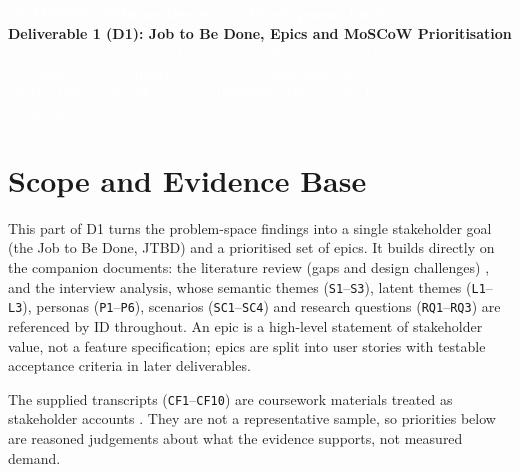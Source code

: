 \documentclass[12pt, a4paper]{article}
\begin{document}
\begin{tcolorbox}[enhanced, colback=cNavy, colframe=cNavy, arc=3pt, left=8pt, right=8pt, top=7pt, bottom=7pt]
\begin{center}
    {\Large\bfseries\textcolor{white}{COMP2300: Software Design and Development Project}}\\[0.2em]
    {\large\bfseries\textcolor{bgSand}{Deliverable 1 (D1): Job to Be Done, Epics and MoSCoW Prioritisation}}\\[0.15em]
    {\small\itshape\textcolor{white}{Topic 1: Carbon Footprint Awareness and Reduction Tool (Urban India Context)}}\\[0.35em]
    {\footnotesize\textcolor{white}{\textbf{Version:} 1.0 (final) \quad|\quad \textbf{Date:} October 2026 \quad|\quad \textbf{Authors:} Arnav (\texttt{am31g25@soton.ac.uk}), Hiranya (\texttt{hm8g25@soton.ac.uk}), Keshav (\texttt{ks3e25@soton.ac.uk})}}
\end{center}
\end{tcolorbox}

\section{Scope and Evidence Base}
This part of D1 turns the problem-space findings into a single stakeholder goal (the Job to Be Done, JTBD) and a prioritised set of epics. It builds directly on the companion documents: the literature review (gaps and design challenges) \cite{lee2021, collins2020, hoffmann2024, froehlich2010}, and the interview analysis, whose semantic themes (\texttt{S1}--\texttt{S3}), latent themes (\texttt{L1}--\texttt{L3}), personas (\texttt{P1}--\texttt{P6}), scenarios (\texttt{SC1}--\texttt{SC4}) and research questions (\texttt{RQ1}--\texttt{RQ3}) are referenced by ID throughout. An epic is a high-level statement of stakeholder value, not a feature specification; epics are split into user stories with testable acceptance criteria in later deliverables.

The supplied transcripts (\texttt{CF1}--\texttt{CF10}) are coursework materials treated as stakeholder accounts \cite{cf1, cf2, cf3, cf4, cf5, cf6, cf7, cf8, cf9, cf10}. They are not a representative sample, so priorities below are reasoned judgements about what the evidence supports, not measured demand.
\end{document}
